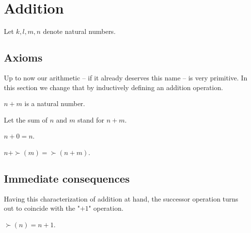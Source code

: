 \documentclass[../../arithmetic.ftl.tex]{subfiles}
\begin{document}
  \section{Addition}

  \begin{forthel}
  \end{forthel}

  \begin{forthel}
    Let $k, l, m, n$ denote natural numbers.
  \end{forthel}


  \subsection{Axioms}

  Up to now our arithmetic -- if it already deserves this name -- is very
  primitive. In this section we change that by inductively defining an addition
  operation.

  \begin{forthel}
    \begin{signature}
      $n + m$ is a natural number.
    \end{signature}

    Let the sum of $n$ and $m$ stand for $n + m$.

    \begin{axiom}\label{Arithmetic_01_02_190669}
      $n + 0 = n$.
    \end{axiom}

    \begin{axiom}\label{Arithmetic_01_02_110889}
      $n + \succ(m) = \succ(n + m)$.
    \end{axiom}
  \end{forthel}


  \subsection{Immediate consequences}

  Having this characterization of addition at hand, the successor operation
  turns out to coincide with the "$+ 1$" operation.

  \begin{forthel}
    \begin{lemma}
      $\succ(n) = n + 1$.
    \end{lemma}
  \end{forthel}
\end{document}
